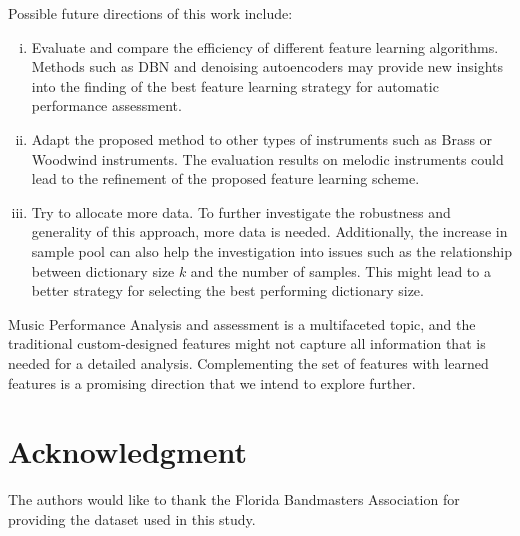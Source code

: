 \documentclass[conference]{IEEEtran}
\begin{document}
Possible future directions of this work include: 
\begin{enumerate}[(i)]
    \item   Evaluate and compare the efficiency of different feature learning algorithms. Methods such as DBN\cite{Hamel2010} and denoising autoencoders \cite{Vincent2008} may provide new insights into the finding of the best feature learning strategy for automatic performance assessment.
    \item   Adapt the proposed method to other types of instruments such as Brass or Woodwind instruments. The evaluation results on melodic instruments could lead to the refinement of the proposed feature learning scheme. 
    \item   Try to allocate more data. To further investigate the robustness and generality of this approach, more data is needed. Additionally, the increase in sample pool can also help the investigation into issues such as the relationship between dictionary size $k$ and the number of samples. This might lead to a better strategy for selecting the best performing dictionary size. 
\end{enumerate}

Music Performance Analysis and assessment is a multifaceted topic, and the traditional custom-designed features might not capture all information that is needed for a detailed analysis. Complementing the set of features with learned features is a promising direction that we intend to explore further.



\section*{Acknowledgment}

The authors would like to thank the Florida Bandmasters Association for providing the dataset used in this study.



%
%
%




\end{document}
